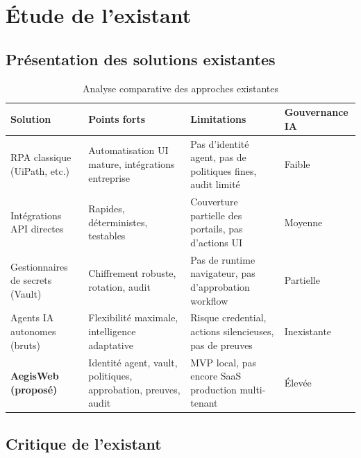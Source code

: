 \section{Étude de l'existant}

\subsection{Présentation des solutions existantes}

\begin{table}[H]
\centering
\caption{Analyse comparative des approches existantes}
\label{tab:existant}
\begin{tabularx}{\textwidth}{@{}lXXC{2.4cm}@{}}
\toprule
\textbf{Solution} & \textbf{Points forts} & \textbf{Limitations}
  & \textbf{Gouvernance IA} \\
\midrule
{}
RPA classique (UiPath, etc.)
  & Automatisation UI mature, intégrations entreprise
  & Pas d'identité agent, pas de politiques fines, audit limité
  & Faible \\
Intégrations API directes
  & Rapides, déterministes, testables
  & Couverture partielle des portails, pas d'actions UI
  & Moyenne \\
Gestionnaires de secrets (Vault)
  & Chiffrement robuste, rotation, audit
  & Pas de runtime navigateur, pas d'approbation workflow
  & Partielle \\
Agents IA autonomes (bruts)
  & Flexibilité maximale, intelligence adaptative
  & Risque credential, actions silencieuses, pas de preuves
  & Inexistante \\
\textbf{AegisWeb (proposé)}
  & Identité agent, vault, politiques, approbation, preuves, audit
  & MVP local, pas encore SaaS production multi-tenant
  & Élevée \\
\bottomrule
\end{tabularx}
\end{table}

\subsection{Critique de l'existant}


